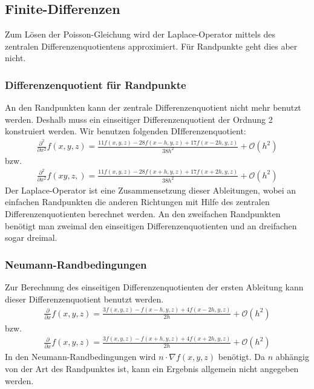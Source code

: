 \subsection{Finite-Differenzen}
Zum Lösen der Poisson-Gleichung wird der Laplace-Operator mittels des zentralen Differenzenquotientens approximiert.
Für Randpunkte geht dies aber nicht.

\subsubsection{Differenzenquotient für Randpunkte}
An den Randpunkten kann der zentrale Differenzenquotient nicht mehr benutzt werden.
Deshalb muss ein einseitiger Differenzenquotient der Ordnung 2 konstruiert werden.
Wir benutzen folgenden DIfferenzenquotient:
\begin{align*}
\frac{\partial^2}{\partial x^2}f(x,y,z)=\frac{11f(x,y,z)-28f(x-h,y,z)+17f(x-2h,y,z)}{38h^2}+\mathcal O(h^2)
\end{align*}
bzw.
\begin{align*}
\frac{\partial^2}{\partial x^2}f(xy,z,)=\frac{11f(x,y,z)-28f(x+h,y,z)+17f(x+2h,y,z)}{38h^2}+\mathcal O(h^2)
\end{align*}
Der Laplace-Operator ist eine Zusammensetzung dieser Ableitungen, wobei an einfachen Randpunkten die anderen Richtungen mit Hilfe des zentralen Differenzenquotienten berechnet werden.
An den zweifachen Randpunkten benötigt man zweimal den einseitigen Differenzenquotienten und an dreifachen sogar dreimal.

\subsubsection{Neumann-Randbedingungen}
Zur Berechnung des einseitigen Differenzenquotienten der ersten Ableitung kann dieser Differenzenquotient benutzt werden.
\begin{align*}
\frac{\partial}{\partial x}f(x,y,z)=\frac{3f(x,y,z)-f(x-h,y,z)+4f(x-2h,y,z)}{2h}+\mathcal O(h^2)
\end{align*}
bzw.
\begin{align*}
\frac{\partial}{\partial x}f(x,y,z)=\frac{3f(x,y,z)-f(x+h,y,z)+4f(x+2h,y,z)}{2h}+\mathcal O(h^2)
\end{align*} 
In den Neumann-Randbedingungen wird $n \cdot \nabla f(x,y,z)$ benötigt. Da $n$ abhängig von der Art des Randpunktes ist, kann ein Ergebnis allgemein nicht angegeben werden.

